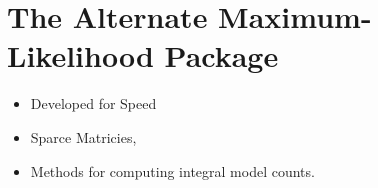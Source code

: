 \section{The Alternate Maximum-Likelihood Package \pointlike}

\begin{itemize}
  \item Developed for Speed
  \item Sparce Matricies, 
  \item Methods for computing integral model counts.
\end{itemize}
